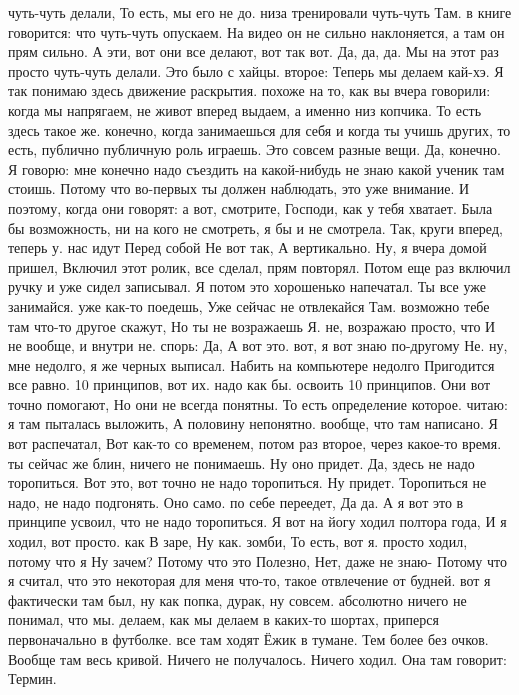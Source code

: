 чуть-чуть делали, То есть, мы его не до.
низа тренировали чуть-чуть Там.
в книге говорится:
что чуть-чуть опускаем.
На видео он не сильно наклоняется, а там он прям сильно.
А эти, вот они все делают, вот так вот.
Да, да, да.
Мы на этот раз просто чуть-чуть делали.
Это было с хайцы. второе:
Теперь мы делаем кай-хэ.
Я так понимаю здесь движение раскрытия. похоже на то, как вы вчера говорили: когда мы напрягаем, не живот вперед выдаем, а именно низ копчика.
То есть здесь такое же.
конечно, когда занимаешься для себя и когда ты учишь других, то есть, публично публичную роль играешь.
Это совсем разные вещи.
Да, конечно.
Я говорю: мне конечно надо съездить на какой-нибудь не знаю какой ученик там стоишь.
Потому что во-первых ты должен наблюдать, это уже внимание.
И поэтому, когда они говорят: а вот,
смотрите, Господи, как у тебя хватает. Была бы возможность, ни на кого не смотреть, я бы и не смотрела. Так, круги вперед, теперь у.
нас идут Перед собой Не вот так, А вертикально. Ну, я вчера домой пришел, Включил этот ролик, все сделал, прям повторял. Потом еще раз включил ручку и уже сидел записывал. Я потом это хорошенько напечатал.
Ты все уже занимайся.
уже как-то поедешь, Уже сейчас не отвлекайся Там. возможно тебе там что-то другое скажут, Но ты не возражаешь Я.
не, возражаю просто, что И не вообще, и внутри не.
спорь: Да, А вот это. вот, я вот знаю по-другому Не.
ну, мне недолго, я же черных выписал.
Набить на компьютере недолго Пригодится все равно.
10 принципов, вот их.
надо как бы.
освоить 10 принципов. Они вот точно помогают, Но они не всегда понятны. То есть определение которое.
читаю: я там пыталась выложить, А половину непонятно.
вообще, что там написано.
Я вот распечатал, Вот как-то со временем, потом раз второе, через какое-то время. ты сейчас же блин, ничего не понимаешь.
Ну оно придет.
Да, здесь не надо торопиться.
Вот это, вот точно не надо торопиться.
Ну придет.
Торопиться не надо, не надо подгонять.
Оно само.
по себе переедет, Да да.
А я вот это в принципе усвоил, что не надо торопиться. Я вот на йогу ходил полтора года, И я
ходил, вот просто.
как В заре, Ну как.
зомби, То есть, вот я.
просто ходил, потому что я Ну зачем? Потому что это Полезно, Нет, даже не знаю- Потому что я считал, что это некоторая для меня что-то, такое отвлечение от будней. вот я фактически там был, ну как попка, дурак, ну совсем.
абсолютно ничего не понимал, что мы.
делаем, как мы делаем в каких-то шортах, приперся первоначально в футболке. все там ходят Ёжик в тумане.
Тем более без очков.
Вообще там весь кривой.
Ничего не получалось.
Ничего ходил.
Она там говорит:
Термин.
